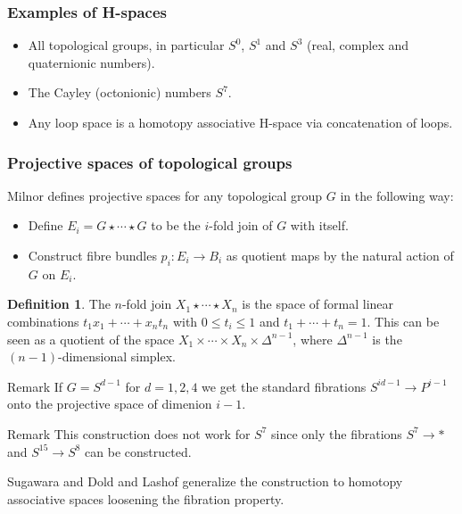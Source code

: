 \documentclass{beamer}
\theoremstyle{definition}
\newtheorem{defi}{Definition}
\begin{document}
\begin{frame}
\frametitle{Examples of H-spaces}
\begin{itemize}
\item<1-> All topological groups, in particular $S^0$, $S^1$ and $S^3$ (real, complex and quaternionic numbers).
\item<2-> The Cayley (octonionic) numbers $S^7$.
\item<3-> Any loop space is a homotopy associative H-space via concatenation of loops. %
\end{itemize}
	
\end{frame}

\begin{frame}
\frametitle{Projective spaces of topological groups}
Milnor defines projective spaces for any topological group $G$ in the following way:\pause
\begin{itemize}
\item<2-> Define $E_i=G\star\cdots\star G$ to be the $i$-fold join of $G$ with itself. 
\item<2-> Construct fibre bundles $p_i:E_i\to B_i$ as quotient maps by the natural action of $G$ on $E_i$.
\end{itemize}\pause
\begin{defi}
The $n$-fold join $X_1\star\cdots\star X_n$ is the space of formal linear combinations $t_1x_1+\cdots+x_nt_n$ with $0\leq t_i\leq 1$ and $t_1+\cdots+t_n=1$. This can be seen as a quotient of the space $X_1\times\cdots\times X_n\times\Delta^{n-1}$, where $\Delta^{n-1}$ is the $(n-1)$-dimensional simplex.
\end{defi}

\end{frame}

\begin{frame}
\begin{block}{Remark}
If $G=S^{d-1}$ for $d=1,2,4$ we get the standard fibrations $S^{id-1}\to P^{i-1}$ onto the projective space of dimenion $i-1$.
\end{block}\pause
\begin{block}{Remark}
This construction does not work for $S^7$ since only the fibrations $S^7\to *$ and $S^{15}\to S^8$ can be constructed.
\end{block}\pause


Sugawara and Dold and Lashof generalize the construction to homotopy associative spaces loosening the fibration property.
\end{frame}
\end{document}
